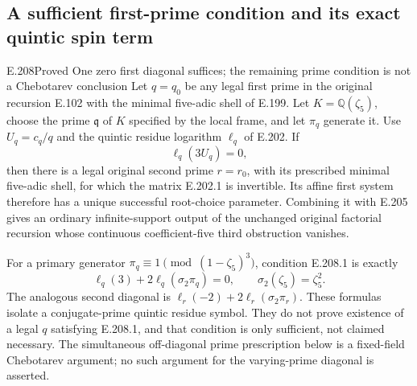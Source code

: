 \subsection{A sufficient first-prime condition and its exact quintic spin term}

\begin{result}{E.208}{Proved}
{One zero first diagonal suffices; the remaining prime condition is not a Chebotarev conclusion}
Let $q=q_0$ be any legal first prime in the original recursion
E.102 with the minimal five-adic shell of E.199. Let
$K=\mathbb Q(\zeta_5)$, choose the prime $\mathfrak q$ of $K$
specified by the local frame, and let $\pi_q$ generate it.
Use $U_q=c_q/q$ and the quintic residue logarithm $\ell_q$
of E.202. If
\[
                         \ell_q(3U_q)=0,                         \tag{E.208.1}
\]
then there is a legal original second prime $r=r_0$, with
its prescribed minimal five-adic shell, for which the
matrix E.202.1 is invertible. Its affine first system
therefore has a unique successful root-choice parameter.
Combining it with E.205 gives an ordinary infinite-support
output of the unchanged original factorial recursion whose
continuous coefficient-five third obstruction vanishes.

For a primary generator
$\pi_q\equiv1\pmod{(1-\zeta_5)^3}$, condition E.208.1 is
exactly
\[
               \ell_q(3)+2\ell_q(\sigma_2\pi_q)=0,
               \qquad\sigma_2(\zeta_5)=\zeta_5^2.               \tag{E.208.2}
\]
The analogous second diagonal is
$\ell_r(-2)+2\ell_r(\sigma_2\pi_r)$.
These formulas isolate a conjugate-prime quintic residue
symbol. They do not prove existence of a legal $q$
satisfying E.208.1, and that condition is only sufficient,
not claimed necessary. The simultaneous off-diagonal
prime prescription below is a fixed-field Chebotarev
argument; no such argument for the varying-prime diagonal
is asserted.
\end{result}


